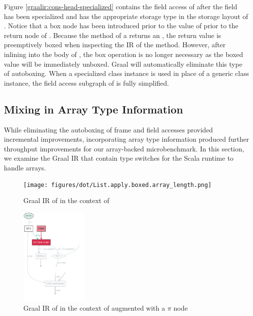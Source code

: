 Figure \ref{graalir:cons-head-specialized} contains the field access of  after the field has been specialized and has the appropriate storage type in the storage layout of .
Notice that a box node has been introduced prior to the value of  prior to the return node of .
Because the  method of a  returns an , the return value is preemptively boxed when inspecting the IR of the method.
However, after inlining into the body of , the box operation is no longer necessary as the boxed value will be immediately unboxed.
Graal will automatically eliminate this type of autoboxing.
When a specialized class instance is used in place of a generic class instance, the field access subgraph of  is fully simplified.

\subsection{Mixing in Array Type Information}

While eliminating the autoboxing of frame and field accesses provided incremental improvements, incorporating array type information produced further throughput improvements for our array-backed microbenchmark.
In this section, we examine the Graal IR that contain type switches for the Scala runtime to handle arrays.

\begin{figure}[H]
	\centering
	\texttt{[image: figures/dot/List.apply.boxed.array\_length.png]}
	\caption{Graal IR of  in the context of }
	\label{graalir:list-apply-boxed-array-length}
\end{figure}

\begin{figure}[!htb]
	\centering
	\includegraphics[width=0.3\textwidth]{figures/dot/List.apply.specialized.array_length.png}
	\caption{Graal IR of  in the context of  augmented with a $\pi$ node}
	\label{graalir:list-apply-specialized-array-length}
\end{figure}

